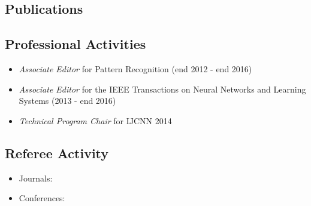\documentclass[a4paper,10pt]{article}
\begin{document}
\subsection*{Publications}



\subsection*{Professional Activities}
\begin{itemize}
\item {\em Associate Editor} for Pattern Recognition (end 2012 - end 2016)
\item {\em Associate Editor} for the IEEE Transactions on Neural Networks and Learning Systems (2013 - end 2016)
\item {\em Technical Program Chair} for IJCNN 2014
\end{itemize}

\subsection*{Referee Activity}
\begin{itemize}
\item Journals:


\item Conferences: 

\end{itemize}
\end{document}
